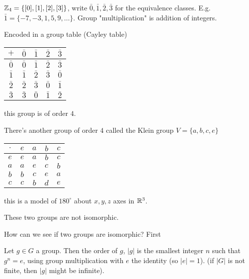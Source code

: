 \documentclass[10pt, a4paper]{article}
\begin{document}
\begin{example}
    $\mathbb{Z}_4 = \{[0], [1], [2], [3]\}$,
    write $\bar{0}, \bar{1}, \bar{2}, \bar{3}$ for the equivalence classes.
    E.g. $\bar{1} = \{-7, -3, 1, 5, 9, \dotsc\}$.
    Group "multiplication" is addition of integers.

    Encoded in a group table
    (Cayley table)
    \begin{table}[H]
        \centering
        \begin{tabular}{c|cccc}
             $+$ & $\bar{0}$ & $\bar{1}$ & $\bar{2}$ & $\bar{3}$  \\
             \hline
             $\bar{0}$ & $\bar{0}$ & $\bar{1}$ & $\bar{2}$ & $\bar{3}$  \\
             $\bar{1}$ & $\bar{1}$ & $\bar{2}$ & $\bar{3}$ & $\bar{0}$  \\
             $\bar{2}$ & $\bar{2}$ & $\bar{3}$ & $\bar{0}$ & $\bar{1}$  \\
             $\bar{3}$ & $\bar{3}$ & $\bar{0}$ & $\bar{1}$ & $\bar{2}$
        \end{tabular}
    \end{table}
    this group is of order $4$.

    There's another group of order $4$ called the Klein group $V = \{a, b, c, e\}$
    \begin{table}[H]
        \centering
        \begin{tabular}{c|cccc}
             $\cdot$ & $e$ & $a$ & $b$ & $c$  \\
             \hline
             $e$ & $e$ & $a$ & $b$ & $c$ \\
             $a$ & $a$ & $e$ & $c$ & $b$ \\
             $b$ & $b$ & $c$ & $e$ & $a$ \\
             $c$ & $c$ & $b$ & $d$ & $e$
        \end{tabular}
    \end{table}
    this is a model of $180 ^ {\circ}$ about $x, y, z$ axes in $\mathbb{R} ^ 3$.

    These two groups are not isomorphic.
\end{example}

How can we see if two groups are isomorphic?
First

\begin{definition}
    Let $g \in G$ a group.
    Then the order of $g$,
    $|g|$ is the smallest integer $n$ such that $g ^ n = e$,
    using group multiplication with $e$ the identity
    (so $|e| = 1$).
    (if $|G|$ is not finite,
    then $|g|$ might be infinite).
\end{definition}
\end{document}
